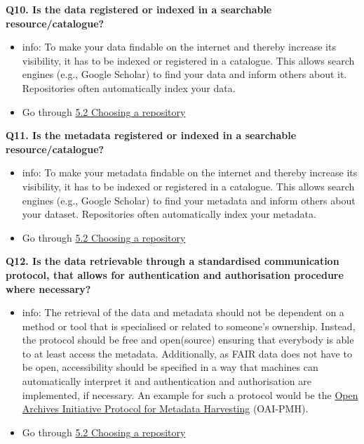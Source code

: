\documentclass[
]{book}
\providecommand{\tightlist}{%
  \setlength{\itemsep}{0pt}\setlength{\parskip}{0pt}}
\begin{document}
\textbf{Q10. Is the data registered or indexed in a searchable resource/catalogue?}

\begin{itemize}
\tightlist
\item
  info: To make your data findable on the internet and thereby increase its visibility, it has to be indexed or registered in a catalogue. This allows search engines (e.g., Google Scholar) to find your data and inform others about it. Repositories often automatically index your data.
\item
  Go through \protect\hyperlink{choosing-a-repository}{5.2 Choosing a repository}
\end{itemize}

\textbf{Q11. Is the metadata registered or indexed in a searchable resource/catalogue?}

\begin{itemize}
\tightlist
\item
  info: To make your metadata findable on the internet and thereby increase its visibility, it has to be indexed or registered in a catalogue. This allows search engines (e.g., Google Scholar) to find your metadata and inform others about your dataset. Repositories often automatically index your metadata.
\item
  Go through \protect\hyperlink{choosing-a-repository}{5.2 Choosing a repository}
\end{itemize}

\textbf{Q12. Is the data retrievable through a standardised communication protocol, that allows for authentication and authorisation procedure where necessary?}

\begin{itemize}
\tightlist
\item
  info: The retrieval of the data and metadata should not be dependent on a method or tool that is specialised or related to someone's ownership. Instead, the protocol should be free and open(source) ensuring that everybody is able to at least access the metadata. Additionally, as FAIR data does not have to be open, accessibility should be specified in a way that machines can automatically interpret it and authentication and authorisation are implemented, if necessary. An example for such a protocol would be the \href{https://www.openarchives.org/pmh/}{Open Archives Initiative Protocol for Metadata Harvesting} (OAI-PMH).
\item
  Go through \protect\hyperlink{choosing-a-repository}{5.2 Choosing a repository}
\end{itemize}
\end{document}
